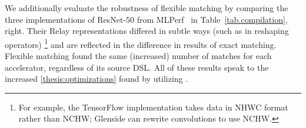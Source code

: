 We additionally
  evaluate the robustness
  of flexible matching
  by comparing
  the three implementations of ResNet-50
  from MLPerf~\cite{reddi2020mlperf}
  in Table~\ref{tab.compilation}, right.
Their Relay representations 
  differed in subtle ways (such as in reshaping operators)%
  \footnote{
For example, the TensorFlow implementation
  takes data in NHWC format rather than NCHW;
  Glenside can rewrite convolutions to use NCHW.}
  and are reflected in the difference in results of exact matching.
Flexible matching found the same (increased) number of matches for each accelerator, regardless of its source DSL.
All of these results speak to the increased
  \cref{thesis:optimizations}
  found by utilizing \g.